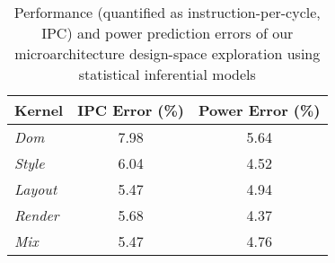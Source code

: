 
\begin{table}[t]
\large
\centering
\captionsetup{width=.8\columnwidth}
\caption{Performance (quantified as instruction-per-cycle, IPC) and power prediction errors of our microarchitecture design-space exploration using statistical inferential models}
\renewcommand*{\arraystretch}{1.4}
\renewcommand*{\tabcolsep}{15pt}
\resizebox{.8\columnwidth}{!}
{
	\begin{tabular}{l c c}
	\toprule[0.15em]
	\bigstrut\textbf{Kernel}	& \bigstrut\textbf{IPC Error (\%)} & \bigstrut\textbf{Power Error (\%)} \\
	\midrule[0.05em]
	\textit{Dom}		&	7.98	&	5.64	\\
	\textit{Style}		&	6.04	&	4.52	\\
	\textit{Layout}	&	5.47	&	4.94	\\
	\textit{Render}	&	5.68	&	4.37	\\
	\textit{Mix}		&	5.47	&	4.76	\\
	\bottomrule[0.15em]
	\end{tabular}
}
\label{tab:model}
\end{table}
